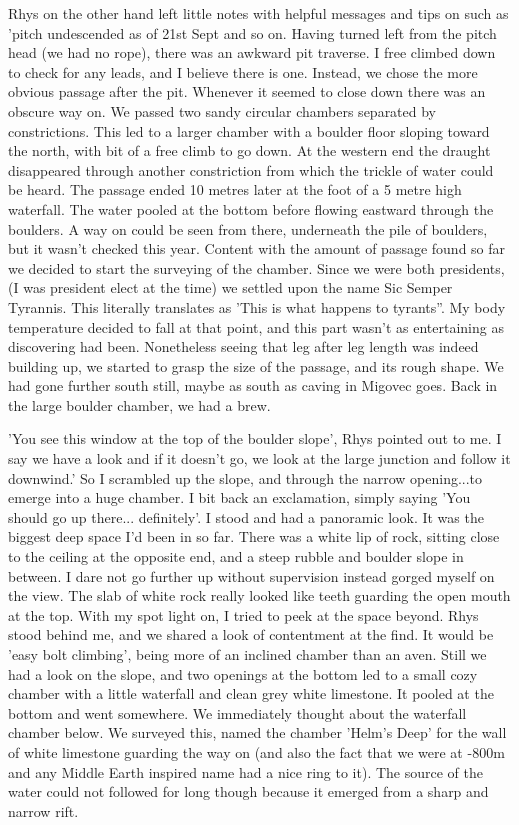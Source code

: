 \documentclass[onecolumn]{book}
\begin{document}
Rhys on the other hand left little notes with helpful messages and tips on such as 'pitch undescended as of 21st Sept and so on. Having turned left from the pitch head (we had no rope), there was an awkward pit traverse. I free climbed down to check for any leads, and I believe there is one. Instead, we chose the more obvious passage after the pit. Whenever it seemed to close down there was an obscure way on. We passed two sandy circular chambers separated by constrictions. This led to a larger chamber with a boulder floor sloping toward the north, with bit of a free climb to go down. At the western end the draught disappeared through another constriction from which the trickle of water could be heard. The passage ended 10 metres later at the foot of a 5 metre high waterfall. The water pooled at the bottom before flowing eastward through the boulders. A way on could be seen from there, underneath the pile of boulders, but it wasn't checked this year. Content with the amount of passage found so far we decided to start the surveying of the chamber. Since we were both presidents, (I was president elect at the time) we settled upon the name Sic Semper Tyrannis. This literally translates as 'This is what happens to tyrants''. My body temperature decided to fall at that point, and this part wasn't as entertaining as discovering had been. Nonetheless seeing that leg after leg length was indeed building up, we started to grasp the size of the passage, and its rough shape. We had gone further south still, maybe as south as caving in Migovec goes. Back in the large boulder chamber, we had a brew.

'You see this window at the top of the boulder slope', Rhys pointed out to me. I say we have a look and if it doesn't go, we look at the large junction and follow it downwind.' So I scrambled up the slope, and through the narrow opening...to emerge into a huge chamber. I bit back an exclamation, simply saying 'You should go up there... definitely'. I stood and had a panoramic look. It was the biggest deep space I'd been in so far. There was a white lip of rock, sitting close to the ceiling at the opposite end, and a steep rubble and boulder slope in between. I dare not go further up without supervision instead gorged myself on the view. The slab of white rock really looked like teeth guarding the open mouth at the top.
With my spot light on, I tried to peek at the space beyond. Rhys stood behind me, and we shared a look of contentment at the find. It would be 'easy bolt climbing', being more of an inclined chamber than an aven. Still we had a look on the slope, and two openings at the bottom led to a small cozy chamber with a little waterfall and clean grey white limestone. It pooled at the bottom and went somewhere. We immediately thought about the waterfall chamber below. We surveyed this, named the chamber 'Helm's Deep' for the wall of white limestone guarding the way on (and also the fact that we were at -800m and any Middle Earth inspired name had a nice ring to it). The source of the water could not followed for long though because it emerged from a sharp and narrow rift.
\end{document}
